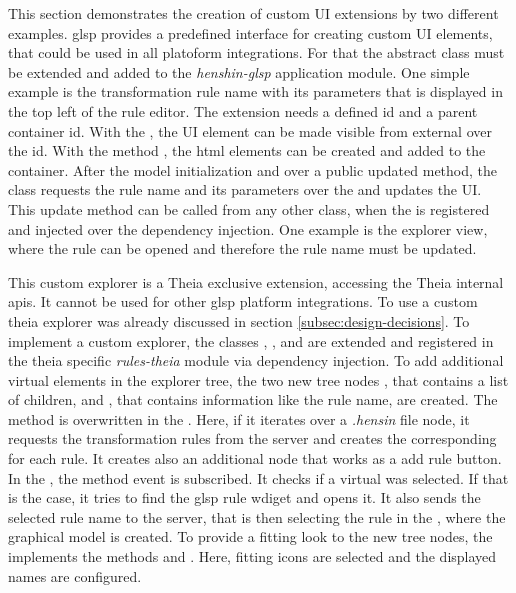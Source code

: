   This section demonstrates the creation of custom UI extensions by two different examples. \ac{glsp} provides a predefined interface for creating custom UI elements, that could be used in all platoform integrations. For that the abstract class  must be extended and added to the \textit{henshin-glsp} application module. One simple example is the transformation rule name with its parameters that is displayed in the top left of the rule editor. The extension needs a defined id and a parent container id. With the , the UI element can be made visible from external over the id. With the method , the \acs{html} elements can be created and added to the container. After the model initialization and over a public updated method, the class requests the rule name and its parameters over the  and updates the UI. This update method can be called from any other class, when the  is registered and injected over the dependency injection. One example is the explorer view, where the rule can be opened and therefore the rule name must be updated.
  
  This custom explorer is a Theia exclusive extension, accessing the Theia internal \acsp{api}. It cannot be used for other \ac{glsp} platform integrations. To use a custom theia explorer was already discussed in section \ref{subsec:design-decisions}. To implement a custom explorer, the classes , , and  are extended and registered in the theia specific \textit{rules-theia} module via dependency injection. To add additional virtual elements in the explorer tree, the two new tree nodes , that contains a list of children, and , that contains information like the rule name, are created. The method  is overwritten in the . Here, if it iterates over a \textit{.hensin} file node, it requests the transformation rules from the server and creates the corresponding  for each rule. It creates also an additional node that works as a \glqq{}add rule\grqq{} button. In the , the method  event is subscribed. It checks if a virtual  was selected. If that is the case, it tries to find the \ac{glsp} rule wdiget and opens it. It also sends the selected rule name to the server, that is then selecting the rule in the , where the graphical model is created. To provide a fitting look to the new tree nodes, the  implements the methods  and . Here, fitting icons are selected and the displayed names are configured.

    